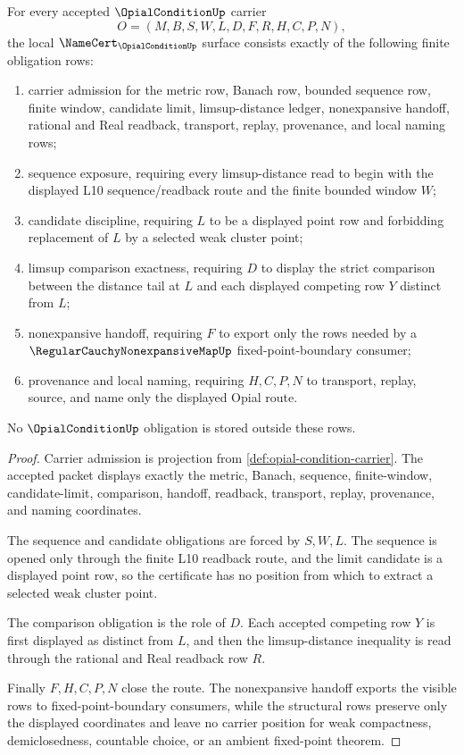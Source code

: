 \begin{theorem}
\label{thm:opial-condition-namecert-obligations}
For every accepted $\OpialConditionUp$ carrier
$$
O=(M,B,S,W,L,D,F,R,H,C,P,N),
$$
the local $\NameCert_{\OpialConditionUp}$ surface consists exactly of the following finite obligation rows:
\begin{enumerate}
\item carrier admission for the metric row, Banach row, bounded sequence row, finite window, candidate limit, limsup-distance ledger, nonexpansive handoff, rational and Real readback, transport, replay, provenance, and local naming rows;
\item sequence exposure, requiring every limsup-distance read to begin with the displayed L10 sequence/readback route and the finite bounded window $W$;
\item candidate discipline, requiring $L$ to be a displayed point row and forbidding replacement of $L$ by a selected weak cluster point;
\item limsup comparison exactness, requiring $D$ to display the strict comparison between the distance tail at $L$ and each displayed competing row $Y$ distinct from $L$;
\item nonexpansive handoff, requiring $F$ to export only the rows needed by a $\RegularCauchyNonexpansiveMapUp$ fixed-point-boundary consumer;
\item provenance and local naming, requiring $H,C,P,N$ to transport, replay, source, and name only the displayed Opial route.
\end{enumerate}
No $\OpialConditionUp$ obligation is stored outside these rows.
\end{theorem}
\begin{proof}
Carrier admission is projection from \autoref{def:opial-condition-carrier}. The accepted packet displays exactly the metric, Banach, sequence, finite-window, candidate-limit, comparison, handoff, readback, transport, replay, provenance, and naming coordinates.

The sequence and candidate obligations are forced by $S,W,L$. The sequence is opened only through the finite L10 readback route, and the limit candidate is a displayed point row, so the certificate has no position from which to extract a selected weak cluster point.

The comparison obligation is the role of $D$. Each accepted competing row $Y$ is first displayed as distinct from $L$, and then the limsup-distance inequality is read through the rational and Real readback row $R$.

Finally $F,H,C,P,N$ close the route. The nonexpansive handoff exports the visible rows to fixed-point-boundary consumers, while the structural rows preserve only the displayed coordinates and leave no carrier position for weak compactness, demiclosedness, countable choice, or an ambient fixed-point theorem.
\end{proof}


